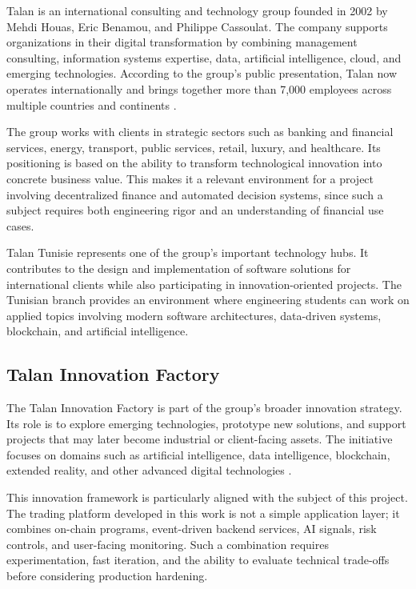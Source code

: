 \documentclass[12pt,a4paper]{report}
\begin{document}
Talan is an international consulting and technology group founded in 2002 by Mehdi Houas, Eric Benamou, and Philippe Cassoulat. The company supports organizations in their digital transformation by combining management consulting, information systems expertise, data, artificial intelligence, cloud, and emerging technologies. According to the group's public presentation, Talan now operates internationally and brings together more than 7,000 employees across multiple countries and continents \cite{talanWho}.

The group works with clients in strategic sectors such as banking and financial services, energy, transport, public services, retail, luxury, and healthcare. Its positioning is based on the ability to transform technological innovation into concrete business value. This makes it a relevant environment for a project involving decentralized finance and automated decision systems, since such a subject requires both engineering rigor and an understanding of financial use cases.

Talan Tunisie represents one of the group's important technology hubs. It contributes to the design and implementation of software solutions for international clients while also participating in innovation-oriented projects. The Tunisian branch provides an environment where engineering students can work on applied topics involving modern software architectures, data-driven systems, blockchain, and artificial intelligence.

\subsection{Talan Innovation Factory}

The Talan Innovation Factory is part of the group's broader innovation strategy. Its role is to explore emerging technologies, prototype new solutions, and support projects that may later become industrial or client-facing assets. The initiative focuses on domains such as artificial intelligence, data intelligence, blockchain, extended reality, and other advanced digital technologies \cite{talanSummer}.

This innovation framework is particularly aligned with the subject of this project. The trading platform developed in this work is not a simple application layer; it combines on-chain programs, event-driven backend services, AI signals, risk controls, and user-facing monitoring. Such a combination requires experimentation, fast iteration, and the ability to evaluate technical trade-offs before considering production hardening.
\end{document}
